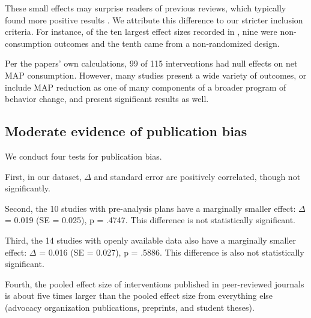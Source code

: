 \documentclass[sn-nature,pdflatex]{sn-jnl}
\begin{document}
These small effects may surprise readers of previous reviews, which
typically found more positive results
\citep{mathur2021meta, meier2022, mertens2022}. We attribute this
difference to our stricter inclusion criteria. For instance, of the ten
largest effect sizes recorded in \citep{mathur2021effectiveness}, nine
were non-consumption outcomes and the tenth came from a non-randomized
design.

Per the papers' own calculations, 99 of 115 interventions had null
effects on net MAP consumption. However, many studies present a wide
variety of outcomes, or include MAP reduction as one of many components
of a broader program of behavior change, and present significant results
as well.

\begin{comment}
Using our calculations of effect size and standard error 15 interventions have 95%
\end{comment}

\subsection{Moderate evidence of publication bias}\label{sec2.2}

We conduct four tests for publication bias.

\begin{comment} 
introductory remarks about how this puts our main results in one light or another? 
\end{comment}

First, in our dataset, \(\Delta\) and standard error are positively
correlated, though not significantly.

Second, the 10 studies with pre-analysis plans have a marginally smaller
effect: \(\Delta\) = 0.019 (SE = 0.025), p = .4747. This difference is
not statistically significant.

Third, the 14 studies with openly available data also have a marginally
smaller effect: \(\Delta\) = 0.016 (SE = 0.027), p = .5886. This
difference is also not statistically significant.

Fourth, the pooled effect size of interventions published in
peer-reviewed journals is about five times larger than the pooled effect
size from everything else (advocacy organization publications,
preprints, and student theses).
\end{document}
